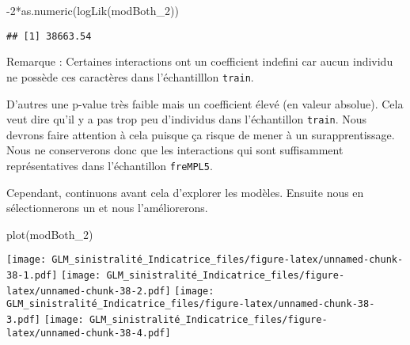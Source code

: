 \documentclass[
]{article}
\newenvironment{Shaded}{\begin{snugshade}}{\end{snugshade}}
\newcommand{\AttributeTok}[1]{\textcolor[rgb]{0.77,0.63,0.00}{#1}}
\newcommand{\DecValTok}[1]{\textcolor[rgb]{0.00,0.00,0.81}{#1}}
\newcommand{\FunctionTok}[1]{\textcolor[rgb]{0.00,0.00,0.00}{#1}}
\newcommand{\NormalTok}[1]{#1}
\newcommand{\OtherTok}[1]{\textcolor[rgb]{0.56,0.35,0.01}{#1}}
\newcommand{\SpecialCharTok}[1]{\textcolor[rgb]{0.00,0.00,0.00}{#1}}
\newcommand{\StringTok}[1]{\textcolor[rgb]{0.31,0.60,0.02}{#1}}
\begin{document}
\begin{Shaded}
\begin{Highlighting}[]
\SpecialCharTok{{-}}\DecValTok{2}\SpecialCharTok{*}\FunctionTok{as.numeric}\NormalTok{(}\FunctionTok{logLik}\NormalTok{(modBoth\_2))}
\end{Highlighting}
\end{Shaded}

\begin{verbatim}
## [1] 38663.54
\end{verbatim}

Remarque : Certaines interactions ont un coefficient indefini car aucun
individu ne possède ces caractères dans l'échantilllon \texttt{train}.

D'autres une p-value très faible mais un coefficient élevé (en valeur
absolue). Cela veut dire qu'il y a pas trop peu d'individus dans
l'échantillon \texttt{train}. Nous devrons faire attention à cela
puisque ça risque de mener à un surapprentissage. Nous ne conserverons
donc que les interactions qui sont suffisamment représentatives dans
l'échantillon \texttt{freMPL5}.

Cependant, continuons avant cela d'explorer les modèles. Ensuite nous en
sélectionnerons un et nous l'améliorerons.

\begin{Shaded}
\begin{Highlighting}[]
\FunctionTok{plot}\NormalTok{(modBoth\_2)}
\end{Highlighting}
\end{Shaded}

\texttt{[image: GLM\_sinistralité\_Indicatrice\_files/figure-latex/unnamed-chunk-38-1.pdf]}
\texttt{[image: GLM\_sinistralité\_Indicatrice\_files/figure-latex/unnamed-chunk-38-2.pdf]}
\texttt{[image: GLM\_sinistralité\_Indicatrice\_files/figure-latex/unnamed-chunk-38-3.pdf]}
\texttt{[image: GLM\_sinistralité\_Indicatrice\_files/figure-latex/unnamed-chunk-38-4.pdf]}

\begin{Shaded}
\end{Shaded}
\end{document}

